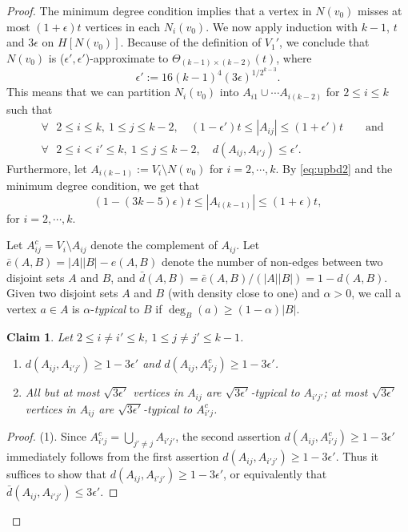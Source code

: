 \documentclass[reqno]{amsart}
\theoremstyle{plain}
\newtheorem{claim}[theorem]{Claim}
\def\eps{\epsilon}
\def\sqe{\sqrt{3\epsilon'}}
\begin{document}
\begin{proof}
The minimum degree condition implies that a vertex in $N(v_0)$ misses at most $(1 + \eps)t$ vertices in each $N_i(v_0)$. We now apply induction with $k-1$, $t$ and $3\eps$ on $H[N(v_0)]$. Because of the definition of $V_1'$, we conclude that $N(v_0)$ is ($\eps', \eps'$)-approximate to $\Theta_{(k-1)\times (k-2)}(t)$, where
\[
\eps' := 16 (k-1)^4 (3\epsilon)^{1/{2^{k-3}}}.
\]
This means that we can partition $N_i (v_0)$ into $A_{i1} \cup \cdots A_{i(k-2)}$ for $2\le i \le k$ such that
\begin{align}
\label{eq:size22}
& \forall \text{ } 2\le i\le k, \ 1\le j\le k - 2, \quad (1- \eps')t \le |A_{ij}| \le (1+ \eps') t  \qquad \text{and}
\\
\label{eq:den22}
& \forall \text{ } 2\le i< i'\le k, \ 1\le j\le k - 2, \quad d(A_{ij}, A_{i'j})\le \eps'.
\end{align}
Furthermore, let $A_{i(k-1)} := V_i \setminus N(v_0)$ for $i = 2,\cdots, k$. By \eqref{eq:upbd2} and the minimum degree condition, we get that
\begin{equation}\label{eq:size21}
 (1- (3k - 5)\eps)t \le |A_{i(k-1)}| \le (1+ \eps) t,
\end{equation}
for $i = 2,\cdots, k$.

Let $A_{ij}^c = V_i \setminus A_{ij}$ denote the complement of $A_{ij}$. Let $\bar{e}(A, B)= |A| |B| - e(A, B)$ denote the number of non-edges between two disjoint sets $A$ and $B$, and $\bar{d}(A, B)= \bar{e}(A, B)/(|A| |B|)= 1 - d(A, B)$. Given two disjoint sets $A$ and $B$ (with density close to one) and $\alpha>0$, we call a vertex $a\in A$ is $\alpha$-\emph{typical} to $B$ if $\deg_B(a)\ge (1- \alpha)|B|$.

\begin{claim}\label{clm:dia}
Let $2\le i\neq i '\le k$, $1\le j\neq j'\le k-1$.
\begin{enumerate}
\item $d(A_{ij}, A_{i'j'}) \ge 1 - 3\eps'$ and $d(A_{ij}, A_{i'j}^c) \ge 1 - 3\eps'$.
\item All but at most $\sqe$ vertices in $A_{ij}$ are $\sqe$-typical to $A_{i'j'}$; at most $\sqe$ vertices in $A_{ij}$ are $\sqe$-typical to $A^c_{i'j}$.
\end{enumerate}
\end{claim}

\begin{proof}
(1). Since $A^c_{i'j}= \bigcup_{j'\ne j} A_{i'j'}$, the second assertion $d(A_{ij}, A_{i'j}^c) \ge 1 - 3\eps'$ immediately follows from the first assertion $d(A_{ij}, A_{i'j'}) \ge 1 - 3\eps'$. Thus it suffices to show that $d(A_{ij}, A_{i'j'}) \ge 1 - 3\eps'$, or equivalently that $\bar{d}(A_{ij}, A_{i'j'}) \le 3\eps'$.


\end{proof}
\end{proof}
\end{document}
